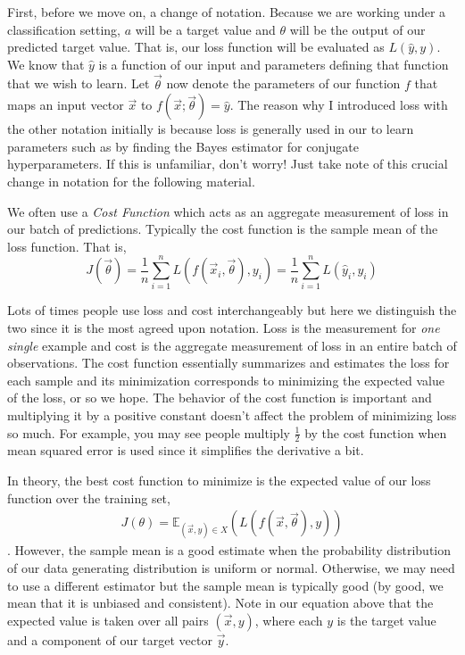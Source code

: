 \documentclass[12pt]{article}
\theoremstyle{definition}
\numberwithin{equation}{section}
\newcommand{\E}{\ensuremath{\mathbb{E}}}
\begin{document}
First, before we move on, a change of notation. Because we are working under a classification setting, $a$ will be a target value and $\theta$ will be the output of our predicted target value. That is, our loss function will be evaluated as $L(\hat y, y)$. We know that $\hat y$ is a function of our input and parameters defining that function that we wish to learn. Let $\vec \theta$ now denote the parameters of our function $f$ that maps an input vector $\vec x$ to $f(\vec x;\vec \theta) = \hat y$. The reason why I introduced loss with the other notation initially is because loss is generally used in our to learn parameters such as by finding the Bayes estimator for conjugate hyperparameters. If this is unfamiliar, don't worry! Just take note of this crucial change in notation for the following material.

We often use a \emph{Cost Function} which acts as an aggregate measurement of loss in our batch of predictions. Typically the cost function is the sample mean of the loss function. That is, $$J(\vec{\theta}) =\frac{1}{n}\sum_{i=1}^n L(f(\vec x_i, \vec\theta), y_i) = \frac{1}{n}\sum_{i=1}^n L(\hat y_i, y_i)$$

Lots of times people use loss and cost interchangeably but here we distinguish the two since it is the most agreed upon notation. Loss is the measurement for \textit{one single} example and cost is the aggregate measurement of loss in an entire batch of observations. The cost function essentially summarizes and estimates the loss for each sample and its minimization corresponds to minimizing the expected value of the loss, or so we hope. The behavior of the cost function is important and multiplying it by a positive constant doesn't affect the problem of minimizing loss so much. For example, you may see people multiply $\frac{1}{2}$ by the cost function when mean squared error is used since it simplifies the derivative a bit.

In theory, the best cost function to minimize is the expected value of our loss function over the training set,
\begin{gather*}
    J(\theta) = \E_{(\vec x, y)\in X}(L(f(\vec x, \vec\theta), y))
\end{gather*} \citep{deeplearning}. However, the sample mean is a good estimate when the probability distribution of our data generating distribution is uniform or normal. Otherwise, we may need to use a different estimator but the sample mean is typically good (by good, we mean that it is unbiased and consistent). Note in our equation above that the expected value is taken over all pairs $(\vec x, y)$, where each $y$ is the target value and a component of our target vector $\vec y$.
\end{document}
